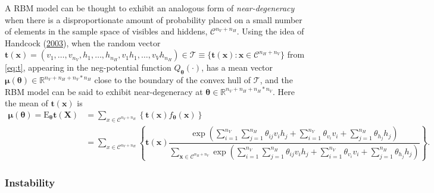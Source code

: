 \documentclass[]{article}
\theoremstyle{definition}
\newcommand{\nv}{{n_{\scriptscriptstyle V}}}
\newcommand{\nh}{{n_{\scriptscriptstyle H}}}
\begin{document}
A RBM model can be thought to exhibit an analogous form of
\emph{near-degeneracy} when there is a disproportionate amount of
probability placed on a small number of elements in the sample space of
visibles and hiddens, \(\mathcal{C}^{\nv + \nh}\). Using the idea of
Handcock (\protect\hyperlink{ref-handcock2003assessing}{2003}), when the
random vector
\(\boldsymbol t(\boldsymbol x) = (v_1, \dots, v_\nv, h_1, \dots, h_\nh, v_1 h_1, \dots, v_V h_\nh ) \in \mathcal{T} \equiv \{\boldsymbol t(\boldsymbol x): \boldsymbol x \in \mathcal{C}^{\nh + \nv} \}\)
from \eqref{eq:t}, appearing in the neg-potential function
\(Q_{\boldsymbol \theta}(\cdot)\), has a mean vector
\(\boldsymbol \mu(\boldsymbol \theta) \in \mathbb{R}^{\nv + \nh + \nv * \nh}\)
close to the boundary of the convex hull of \(\mathcal{T}\), and the RBM
model can be said to exhibit near-degeneracy at
\(\boldsymbol \theta \in \mathbb{R}^{\nv + \nh + \nh*\nv}\). Here the
mean of \(\boldsymbol t(\boldsymbol x)\) is \begin{align*}
\boldsymbol \mu(\boldsymbol \theta) = \text{E}_{\boldsymbol \theta} \boldsymbol t(\boldsymbol X)  &= \sum\limits_{x \in \mathcal{C}^{\nv + \nh}} \left\{ \boldsymbol t(\boldsymbol x) f_{\boldsymbol \theta} (\boldsymbol x) \right\} \\
&= \sum\limits_{x \in \mathcal{C}^{\nv + \nh}} \left\{ \boldsymbol t(\boldsymbol x)\dfrac{\exp\left(\sum\limits_{i = 1}^\nv \sum\limits_{j=1}^\nh \theta_{ij} v_i h_j + \sum\limits_{i = 1}^\nv\theta_{v_i} v_i + \sum\limits_{j = 1}^\nh\theta_{h_j} h_j\right)}{\sum\limits_{\boldsymbol x \in \mathcal{C}^{\nh + \nv}}\exp\left(\sum\limits_{i = 1}^\nv \sum\limits_{j=1}^\nh \theta_{ij} v_i h_j + \sum\limits_{i = 1}^\nv\theta_{v_i} v_i + \sum\limits_{j = 1}^\nh\theta_{h_j} h_j\right)}\right\}.
\end{align*}
\hypertarget{instability}{%
\subsubsection{Instability}\label{instability}}
\end{document}
